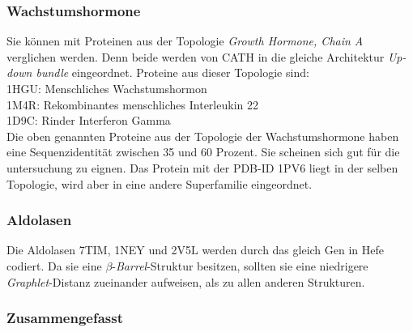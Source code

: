 \documentclass{report}
\begin{document}
\subsubsection{Wachstumshormone}

Sie k\"onnen mit Proteinen aus der Topologie \textit{Growth Hormone, Chain A} verglichen werden. Denn beide werden von CATH in die gleiche Architektur \emph{Up-down bundle} eingeordnet. Proteine aus dieser Topologie sind: \\
1HGU: Menschliches Wachstumshormon\\
1M4R: Rekombinantes menschliches Interleukin 22\\
1D9C: Rinder Interferon Gamma \\
Die oben genannten Proteine aus der Topologie der Wachstumshormone haben eine Sequenzidentit\"at zwischen 35 und 60 Prozent. Sie scheinen sich gut f\"ur die untersuchung zu eignen.
Das Protein mit der PDB-ID 1PV6 liegt in der selben Topologie, wird aber in eine andere Superfamilie eingeordnet.

\subsubsection{Aldolasen}

Die Aldolasen 7TIM, 1NEY und 2V5L werden durch das gleich Gen in Hefe codiert. Da sie eine $\beta$-\textit{Barrel}-Struktur besitzen, sollten sie eine niedrigere \textit{Graphlet}-Distanz zueinander aufweisen, als zu allen anderen Strukturen.

\subsubsection{Zusammengefasst}
\end{document}
